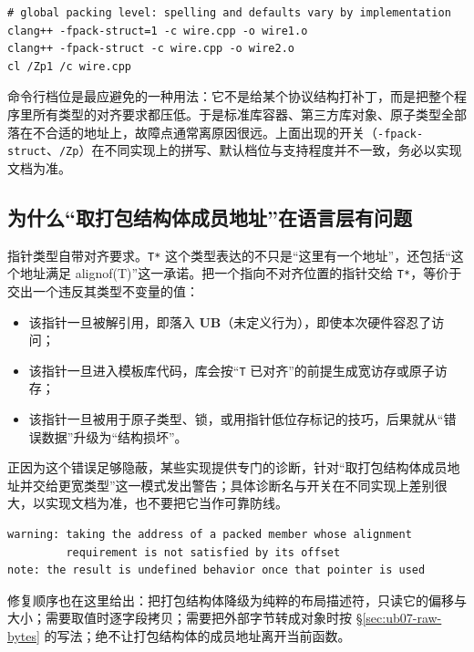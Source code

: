 \documentclass[12pt,a4paper,fontset=fandol]{ctexbook}
\newcommand{\Tp}[1]{\texttt{#1}}
\newcommand{\Lang}[1]{\textsf{#1}}
\newcommand{\UB}{\textbf{\textsf{UB}}}
\newcommand{\Feat}[1]{\texttt{#1}}
\begin{document}
\begin{lstlisting}[style=shellstyle,language=ShellUB,caption={全局档位把压缩规则施加给每一个类型}]
# global packing level: spelling and defaults vary by implementation
clang++ -fpack-struct=1 -c wire.cpp -o wire1.o
clang++ -fpack-struct -c wire.cpp -o wire2.o
cl /Zp1 /c wire.cpp
\end{lstlisting}

命令行档位是最应避免的一种用法：它不是给某个协议结构打补丁，而是把整个程序里所有类型的对齐要求都压低。于是标准库容器、第三方库对象、原子类型全部落在不合适的地址上，故障点通常离原因很远。上面出现的开关（\Feat{-fpack-struct}、\Feat{/Zp}）在不同实现上的拼写、默认档位与支持程度并不一致，务必以实现文档为准。

\subsection{为什么“取打包结构体成员地址”在语言层有问题}\label{sec:ub07-packed-member-address}

指针类型自带对齐要求。\Tp{T*} 这个类型表达的不只是“这里有一个地址”，还包括“这个地址满足 \Lang{alignof}(T)”这一承诺。把一个指向不对齐位置的指针交给 \Tp{T*}，等价于交出一个违反其类型不变量的值：

\begin{itemize}
\item 该指针一旦被解引用，即落入 \UB（未定义行为），即使本次硬件容忍了访问；
\item 该指针一旦进入模板库代码，库会按“\Tp{T} 已对齐”的前提生成宽访存或原子访存；
\item 该指针一旦被用于原子类型、锁，或用指针低位存标记的技巧，后果就从“错误数据”升级为“结构损坏”。
\end{itemize}

正因为这个错误足够隐蔽，某些实现提供专门的诊断，针对“取打包结构体成员地址并交给更宽类型”这一模式发出警告；具体诊断名与开关在不同实现上差别很大，以实现文档为准，也不要把它当作可靠防线。

\begin{lstlisting}[style=outstyle,caption={此类诊断的典型形态（示意措辞，实际文本以实现为准）}]
warning: taking the address of a packed member whose alignment
         requirement is not satisfied by its offset
note: the result is undefined behavior once that pointer is used
\end{lstlisting}

修复顺序也在这里给出：把打包结构体降级为纯粹的布局描述符，只读它的偏移与大小；需要取值时逐字段拷贝；需要把外部字节转成对象时按 §\ref{sec:ub07-raw-bytes} 的写法；绝不让打包结构体的成员地址离开当前函数。
\end{document}
